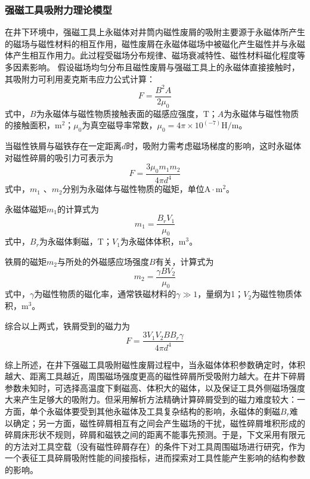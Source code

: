 \subsubsection{强磁工具吸附力理论模型}
在井下环境中，强磁工具上永磁体对井筒内磁性废屑的吸附主要源于永磁体所产生的磁场与磁性材料的相互作用，磁性废屑在永磁体磁场中被磁化产生磁性并与永磁体产生相互作用力。此过程受磁场分布规律、磁场衰减特性、磁性材料磁化程度等多因素影响。
假设磁场均匀分布且磁性废屑与强磁工具上的永磁体直接接触时，其吸附力可利用麦克斯韦应力公式计算：
\begin{equation}
	F=\frac{B^2A}{2\mu_0}
\end{equation}
式中，$B$为永磁体与磁性物质接触表面的磁感应强度，$\mathrm{T}$；$A$为永磁体与磁性物质的接触面积，$\mathrm{m}^2$；$\mu_0$为真空磁导率常数，$\mu_0=4\pi×10^(-7) \mathrm{H/m}$。

当磁性铁屑与磁铁存在一定距离$d$时，吸附力需考虑磁场梯度的影响，这时永磁体对磁性碎屑的吸引力可表示为
\begin{equation}
	F=\frac{3\mu_0 m_1m_2}{4\pi d^4}
\end{equation}
式中，$m_1$ 、$m_2$分别为永磁体与磁性物质的磁矩，单位$\mathrm{A}\cdot \mathrm{m}^2$。

永磁体磁矩$m_1$的计算式为
\begin{equation}
	m_1=\frac{B_rV_1}{\mu_0}
\end{equation}
式中，$B_r$为永磁体剩磁，$\mathrm{T}$；$V_1$为永磁体体积，$\mathrm{m}^3$。

铁屑的磁矩$m_2$与所处的外磁感应场强度$B$有关，计算式为
	\begin{equation}
		m_2 = \frac{\gamma B V_2}{\mu_0}
	\end{equation}
式中，$\gamma$为磁性物质的磁化率，通常铁磁材料的$\gamma≫1$，量纲为1；$V_2$为磁性物质体积，$\mathrm{m}^3$。

综合以上两式，铁屑受到的磁力为
\begin{equation}
	F=\frac{3V_1V_2BB_r\gamma}{4\pi d^4}
\end{equation}

综上所述，在井下强磁工具吸附磁性废屑过程中，当永磁体体积参数确定时，体积越大、距离工具越近，周围磁场强度更高的磁性碎屑所受吸附力越大。在井下碎屑参数未知时，可选择高温度下剩磁高、体积大的磁体，以及保证工具外侧磁场强度大来产生足够大的吸附力。但采用解析方法精确计算碎屑受到的磁力难度较大：一方面，单个永磁体要受到其他永磁体及工具复杂结构的影响，永磁体的剩磁$B_r$难以确定；另一方面，磁性碎屑相互有之间会产生磁场的干扰，磁性碎屑堆积形成的碎屑床形状不规则，碎屑和磁铁之间的距离不能事先预测。于是，下文采用有限元的方法对工具空载（没有磁性碎屑存在）的条件下对工具周围磁场进行研究，作为一个表征工具碎屑吸附性能的间接指标，进而探索对工具性能产生影响的结构参数的影响。

